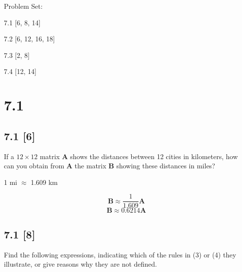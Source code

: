 \documentclass{article}
\begin{document}
{\large \noindent Problem Set:}

\par 7.1 [6, 8, 14]
\par 7.2 [6, 12, 16, 18]
\par 7.3 [2, 8]
\par 7.4 [12, 14]
\vspace{5mm}

\noindent \hrulefill

\section*{7.1}
\setcounter{equation}{0}

\subsection*{7.1 [6]}

\par If a $12\times12$ matrix {\textbf{A}} shows the distances between 12 cities in kilometers, how can you obtain from \textbf{A} the matrix \textbf{B} showing these distances in miles?

\begin{center}
    1 mi $\approx$ 1.609 km
\end{center}
\begin{equation}
    \textbf{B} \approx \frac{1}{1.609} \textbf{A}
\end{equation}
\begin{equation}
    \textbf{B} \approx 0.6214\textbf{A}
\end{equation}

\subsection*{7.1 [8]}

\par Find the following expressions, indicating which of the rules in (3) or (4) they illustrate, or give reasons why they are not defined.

\def \Amatrix {
    \begin{bmatrix}
    0 & 2 & 4\\
    6 & 5 & 5\\
    1 & 0 & -3
    \end{bmatrix}
}
\def \Bmatrix {
    \begin{bmatrix}
    0 & 5 & 2\\
    5 & 3 & 4\\
    -2 & 4 & -2
    \end{bmatrix}
}
\end{document}
